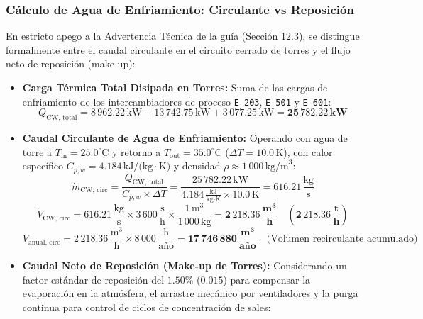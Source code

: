 \documentclass[10pt,letterpaper]{article}
\begin{document}
\subsubsection{Cálculo de Agua de Enfriamiento: Circulante vs Reposición}
En estricto apego a la Advertencia Técnica de la guía (Sección 12.3), se distingue formalmente entre el caudal circulante en el circuito cerrado de torres y el flujo neto de reposición (make-up):
\begin{itemize}
    \item \textbf{Carga Térmica Total Disipada en Torres:}
    Suma de las cargas de enfriamiento de los intercambiadores de proceso \texttt{E-203}, \texttt{E-501} y \texttt{E-601}:
    \begin{equation}
    Q_{\text{CW, total}} = 8\,962.22\,\text{kW} + 13\,742.75\,\text{kW} + 3\,077.25\,\text{kW} = \mathbf{25\,782.22\,\text{kW}}
    \end{equation}
    \item \textbf{Caudal Circulante de Agua de Enfriamiento:}
    Operando con agua de torre a $T_{\text{in}} = 25.0^\circ\text{C}$ y retorno a $T_{\text{out}} = 35.0^\circ\text{C}$ ($\Delta T = 10.0\,\text{K}$), con calor específico $C_{p,w} = 4.184\,\text{kJ/(kg}\cdot\text{K)}$ y densidad $\rho \approx 1\,000\,\text{kg/m}^3$:
    \begin{equation}
    \dot{m}_{\text{CW, circ}} = \frac{Q_{\text{CW, total}}}{C_{p,w} \times \Delta T} = \frac{25\,782.22\,\text{kW}}{4.184\,\frac{\text{kJ}}{\text{kg}\cdot\text{K}} \times 10.0\,\text{K}} = 616.21\,\frac{\text{kg}}{\text{s}}
    \end{equation}
    \begin{equation}
    \dot{V}_{\text{CW, circ}} = 616.21\,\frac{\text{kg}}{\text{s}} \times 3\,600\,\frac{\text{s}}{\text{h}} \times \frac{1\,\text{m}^3}{1\,000\,\text{kg}} = \mathbf{2\,218.36\,\frac{\text{m}^3}{\text{h}}} \quad \left(\mathbf{2\,218.36\,\frac{\text{t}}{\text{h}}}\right)
    \end{equation}
    \begin{equation}
    V_{\text{anual, circ}} = 2\,218.36\,\frac{\text{m}^3}{\text{h}} \times 8\,000\,\frac{\text{h}}{\text{año}} = \mathbf{17\,746\,880\,\frac{\text{m}^3}{\text{año}}} \quad \text{(Volumen recirculante acumulado)}
    \end{equation}
    \item \textbf{Caudal Neto de Reposición (Make-up de Torres):}
    Considerando un factor estándar de reposición del $1.50\%$ ($0.015$) para compensar la evaporación en la atmósfera, el arrastre mecánico por ventiladores y la purga continua para control de ciclos de concentración de sales:

\end{itemize}
\end{document}
